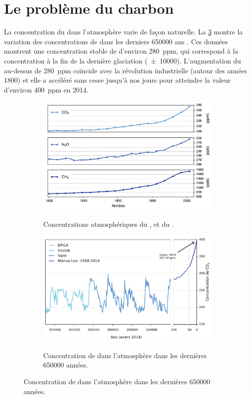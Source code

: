 \section{Le problème du charbon}
La concentration du  dans l’atmosphère varie de façon naturelle. La
\cref{fig:CO2} montre la variation des concentrations de  dans les
derniers \num{650000} ans \citep{Epica,Siple,Vostok,WMO14}. Ces données montrent
une
concentration stable de
 d'environ \SI{280}{ppm}, qui correspond à la concentration à la fin de
la dernière glaciation (\num{\pm 10000}). L'augmentation du  au-dessus
de \SI{280}{ppm}
coïncide avec la révolution industrielle (autour des années 1800) et elle a
accéléré sans cesse jusqu'à nos jours pour atteindre la valeur d'environ
\SI{400}{ppm} en \num{2014}.
\begin{figure}[ht]
        \centering
        \begin{subfigure}[b]{.77\textwidth}
                \caption{Concentrations atmosphériques du ,  et
du .}
                \includegraphics[width=\textwidth]{fig/GES.pdf}
                \label{fig:GES}
        \end{subfigure}%

        \begin{subfigure}[b]{.77\textwidth}
        		\caption{Concentration de  dans l'atmosphère dans les
dernières \num{650000} années.}
                \includegraphics[width=\textwidth]{fig/CO2.pdf}
                \label{fig:CO2}
        \end{subfigure}


\end{figure}
